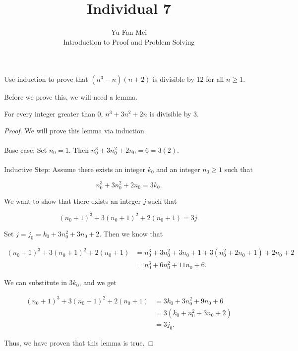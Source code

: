 \documentclass[12pt]{article}
\newenvironment{lemma}[2][Lemma]{\begin{trivlist}
\item[\hskip \labelsep {\bfseries #1}\hskip \labelsep {\bfseries #2.}]}{\end{trivlist}}
\newenvironment{problem}[2][Problem]{\begin{trivlist}
\item[\hskip \labelsep {\bfseries #1}\hskip \labelsep {\bfseries #2.}]}{\end{trivlist}}
\begin{document}

\title{Individual 7}%
\author{Yu Fan Mei\\ %
	Introduction to Proof and Problem Solving} %

\maketitle

\begin{problem}{1}
    Use induction to prove that $(n^3 - n)(n + 2)$ is divisible by $12$ for all $n \geq 1$.
\end{problem}

Before we prove this, we will need a lemma.

\begin{lemma}{1} For every integer greater than 0, $n^3 + 3n^2 + 2n$ is divisible by 3.
\end{lemma}

\begin{proof}
    We will prove this lemma via induction. \\ \\ 
    Base case: Set $n_0 = 1$. Then 
 $n_0^3 + 3n_0^2 + 2n_0 = 6 = 3(2).$ \\ \\
 \noindent
    Inductive Step: Assume there exists an integer $k_0$ and an integer $n_0 \geq 1$ such that

    $$n_0^3 + 3n_0^2 + 2n_0 = 3k_0.$$

    We want to show that there exists an integer $j$ such that

    $$(n_0+1)^3 + 3(n_0+1)^2 + 2(n_0+1) = 3j.$$

    Set $j = j_0 = k_0 + 3n_0^2 + 3n_0 + 2$. Then we know that

    \begin{align*}
        (n_0+1)^3 + 3(n_0+1)^2 + 2(n_0+1) &= n_0^3 + 3n_0^2 + 3n_0 + 1 + 3(n_0^2 + 2n_0 + 1) + 2n_0 + 2\\
        &= n_0^3 + 6n_0^2 + 11n_0 + 6.
    \end{align*}

    We can substitute in $3k_0$, and we get

    \begin{align*}
        (n_0+1)^3 + 3(n_0+1)^2 + 2(n_0+1) &= 3k_0 + 3n_0^2 + 9n_0 + 6 \\
        &= 3(k_0 + n_0^2 + 3n_0 + 2) \\
        &= 3j_0.
    \end{align*}

    Thus, we have proven that this lemma is true.
\end{proof}
\end{document}
